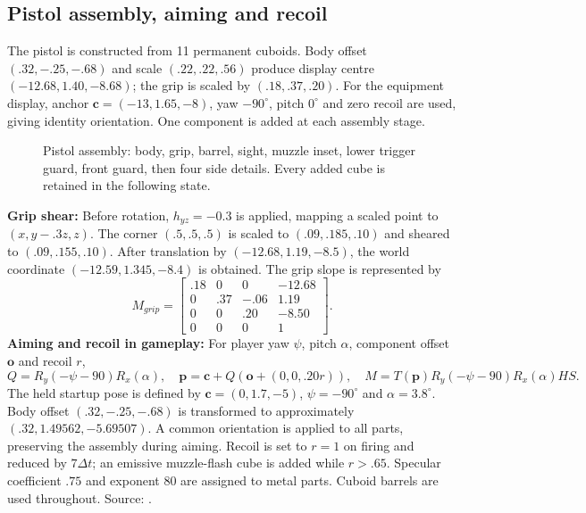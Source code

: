 \subsection{Pistol assembly, aiming and recoil}
The pistol is constructed from 11 permanent cuboids. Body offset $(.32,-.25,-.68)$ and scale $(.22,.22,.56)$ produce display centre $(-12.68,1.40,-8.68)$; the grip is scaled by $(.18,.37,.20)$. For the equipment display, anchor $\mathbf c=(-13,1.65,-8)$, yaw $-90^\circ$, pitch $0^\circ$ and zero recoil are used, giving identity orientation. One component is added at each assembly stage.
\begin{figure}[htbp]

\caption{Pistol assembly: body, grip, barrel, sight, muzzle inset, lower trigger guard, front guard, then four side details. Every added cube is retained in the following state.}
\end{figure}

\textbf{Grip shear:} Before rotation, $h_{yz}=-0.3$ is applied, mapping a scaled point to $(x,y-.3z,z)$. The corner $(.5,.5,.5)$ is scaled to $(.09,.185,.10)$ and sheared to $(.09,.155,.10)$. After translation by $(-12.68,1.19,-8.5)$, the world coordinate $(-12.59,1.345,-8.4)$ is obtained. The grip slope is represented by
\[
 M_{grip}=\begin{bmatrix}.18&0&0&-12.68\\0&.37&-.06&1.19\\0&0&.20&-8.50\\0&0&0&1\end{bmatrix}.
\]
\textbf{Aiming and recoil in gameplay:} For player yaw $\psi$, pitch $\alpha$, component offset $\mathbf o$ and recoil $r$,
\[
 Q=R_y(-\psi-90)R_x(\alpha),\quad
 \mathbf p=\mathbf c+Q(\mathbf o+(0,0,.20r)),\quad
 M=T(\mathbf p)R_y(-\psi-90)R_x(\alpha)HS.
\]
The held startup pose is defined by $\mathbf c=(0,1.7,-5)$, $\psi=-90^\circ$ and $\alpha=3.8^\circ$. Body offset $(.32,-.25,-.68)$ is transformed to approximately $(.32,1.49562,-5.69507)$. A common orientation is applied to all parts, preserving the assembly during aiming. Recoil is set to $r=1$ on firing and reduced by $7\Delta t$; an emissive muzzle-flash cube is added while $r>.65$. Specular coefficient $.75$ and exponent 80 are assigned to metal parts. Cuboid barrels are used throughout. Source: .


